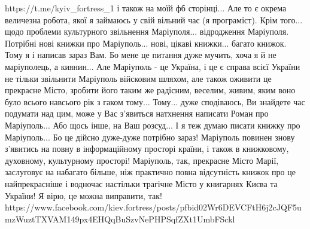 https://t.me/kyiv_fortress_1 і також на моїй фб сторінці... Але то є окрема
величезна робота, якої я займаюсь у свій вільний час (я програміст). Крім
того... щодо проблеми культурного звільнення Маріуполя... відродження
Маріуполя. Потрібні нові книжки про Маріуполь... нові, цікаві книжки... багато
книжок. Тому я і написав зараз Вам. Бо мене це питання дуже мучить, хоча я й не
маріуполець, а киянин... Але Маріуполь - це Україна, і це є справа всієї
України не тільки звільнити Маріуполь війсковим шляхом, але також оживити це
прекрасне Місто, зробити його таким же радісним, веселим, живим, яким воно було
всього навсього рік з гаком тому... Тому... дуже сподіваюсь, Ви знайдете час
подумати над цим, може у Вас з'явиться натхнення написати Роман про
Маріуполь... Або щось інше, на Ваш розсуд... І я теж думаю писати книжку про
Маріуполь...  Бо це дійсно дуже-дуже потрібно зараз! Маріуполь повинен знову
з'явитись на повну в інформаційному просторі країни, і також в книжковому,
духовному, культурному просторі! Маріуполь, так, прекрасне Місто Марії,
заслуговує на набагато більше, ніж практично повна відсутність книжок про це
найпрекрасніше і водночас настільки трагічне Місто у книгарнях Києва та
України! Я вірю, це можна виправити, так!
https://www.facebook.com/kiev.fortress/posts/pfbid02Wr6DEVCFtH6j2cJQF5umzWuztTXVAM149px4EHQqBuSzvNePHPSqfZXt1UmbFSckl


